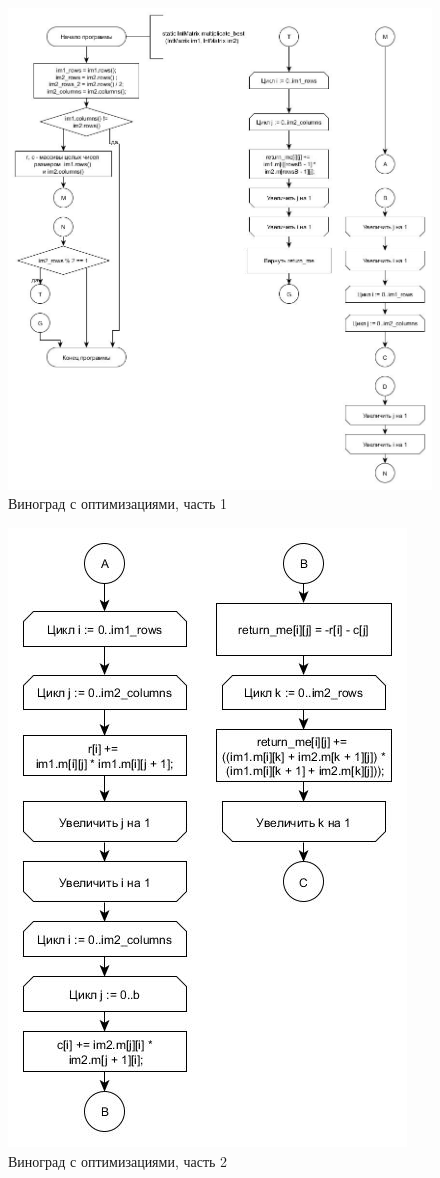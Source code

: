\documentclass[a4paper, 14pt]{article}
\begin{document}
\begin{figure}[h]
\center
\includegraphics[scale=0.4]{vinograd_opt.jpg}
\caption{Виноград с оптимизациями, часть 1}
\label{ris:vin_good1}
\end{figure}

\begin{figure}[h]
\center
\includegraphics[scale=0.5]{vinograd_opt2.jpg}
\caption{Виноград с оптимизациями, часть 2}
\label{ris:vin_good2}
\end{figure}
\end{document}
